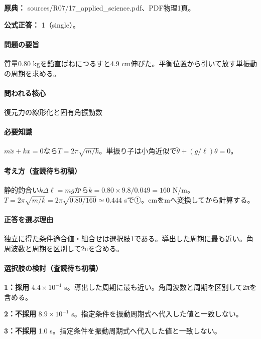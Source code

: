 \noindent\textbf{原典：} sources/R07/17\_applied\_science.pdf、PDF物理1頁。

\textbf{公式正答：} 1（single）。

\paragraph{問題の要旨} 質量0.80 kgを鉛直ばねにつるすと4.9 cm伸びた。平衡位置から引いて放す単振動の周期を求める。

\paragraph{問われる核心} 復元力の線形化と固有角振動数

\paragraph{必要知識} \(m\ddot x+kx=0\)なら\(T=2\pi\sqrt{m/k}\)。単振り子は小角近似で\(\ddot\theta+(g/\ell)\theta=0\)。

\paragraph{考え方（査読待ち初稿）} 静的釣合い\(k\Delta\ell=mg\)から\(k=0.80\times9.8/0.049=160\) N/m。\(T=2\pi\sqrt{m/k}=2\pi\sqrt{0.80/160}\simeq0.444\) sで①。cmをmへ変換してから計算する。

\paragraph{正答を選ぶ理由} 独立に得た条件適合値・組合せは選択肢1である。導出した周期に最も近い。角周波数と周期を区別して2πを含める。

\paragraph{選択肢の検討（査読待ち初稿）}\mbox{}\par

\noindent\textbf{1：採用} \(4.4\times10^{-1}\) s。導出した周期に最も近い。角周波数と周期を区別して2πを含める。\par

\noindent\textbf{2：不採用} \(8.9\times10^{-1}\) s。指定条件を振動周期式へ代入した値と一致しない。\par

\noindent\textbf{3：不採用} 1.0 s。指定条件を振動周期式へ代入した値と一致しない。\par

